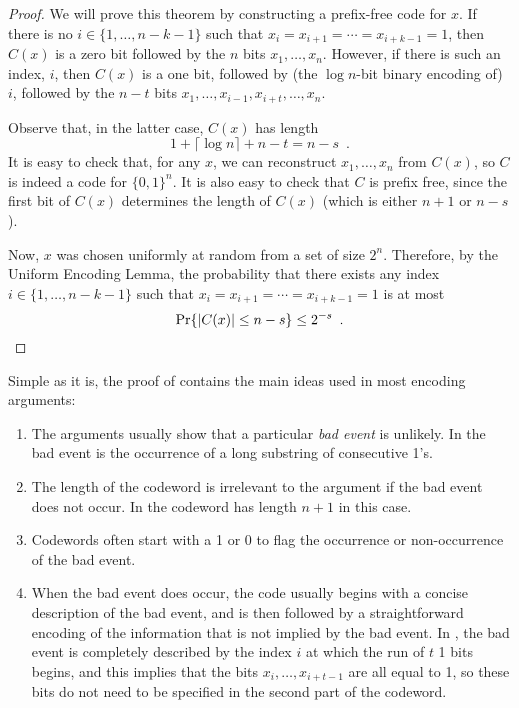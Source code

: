 \documentclass[lotsofwhite]{patmorin}
\begin{document}
\begin{proof}
  We will prove this theorem by constructing a prefix-free code
  for $x$. If there is no $i\in\{1,\ldots,n-k-1\}$ such that
  $x_i=x_{i+1}=\cdots=x_{i+k-1}=1$, then $C(x)$ is a zero bit
  followed by the $n$ bits $x_1,\ldots,x_n$.  However, if there is
  such an index, $i$, then $C(x)$ is a one bit, followed by (the
  $\log n$-bit binary encoding of) $i$, followed by the $n-t$ bits
  $x_1,\ldots,x_{i-1},x_{i+t},\ldots,x_n$.

  Observe that, in the latter case, $C(x)$ has length 
  \[
      1 + \lceil\log n\rceil + n - t = n-s \enspace .
  \]
  It is easy to check that, for any $x$, we can reconstruct
  $x_1,\ldots,x_n$ from $C(x)$, so $C$ is indeed a code for $\{0,1\}^n$.
  It is also easy to check that $C$ is prefix free, since the first bit of
  $C(x)$ determines the length of $C(x)$ (which is either $n+1$ or $n-s$).

  Now, $x$ was chosen uniformly at random from a set of size $2^{n}$.
  Therefore, by the Uniform Encoding Lemma, the probability
  that there exists any index $i\in\{1,\ldots,n-k-1\}$ such that
  $x_i=x_{i+1}=\cdots=x_{i+k-1}=1$ is at most
  \[
      \Pr\{|C(x)|\le n-s\} \le 2^{-s} \enspace . \qedhere 
  \]
\end{proof}

Simple as it is, the proof of  contains the main ideas
used in most encoding arguments:

\begin{enumerate}
  \item The arguments usually show that a particular \emph{bad event}
  is unlikely.  In  the bad event is the occurrence of a long
  substring of consecutive 1's.

  \item The length of the codeword is irrelevant to the argument if
  the bad event does not occur.  In 
  the codeword has length $n+1$ in this case.
 
  \item Codewords often start with a 1 or 0 to flag the occurrence or
  non-occurrence of the bad event.

  \item When the bad event does occur, the code usually begins with
  a concise description of the bad event, and is then followed by a
  straightforward encoding of the information that is not implied by the
  bad event. In , the bad event is completely described
  by the index $i$ at which the run of $t$ 1 bits begins, and this implies
  that the bits $x_i,\ldots,x_{i+t-1}$ are all equal to 1, so these
  bits do not need to be specified in the second part of the codeword. 
\end{enumerate}
\end{document}
